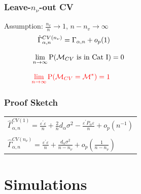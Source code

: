 \documentclass[20pt,mathserif]{beamer}
\begin{document}
\begin{frame}
\frametitle{Leave-$n_\nu$-out CV}
Assumption: $\frac{n_v}{n}\to 1$, $n-n_v\to \infty$
\begin{align*}
&\hspace{0.3cm}\hat{\Gamma}^{CV(n_\nu)}_{\alpha,n}=\Gamma_{\alpha,n}+o_p(1)&\hspace{5cm}&\\[8pt]
&\lim_{n\rightarrow\infty}\mathrm{P}(\mathcal{M}_{CV} \text{ is in Cat I})=0&&\\[8pt]
&{\color{red}\lim_{n\rightarrow\infty}\mathrm{P}(\mathcal{M}_{CV}=\mathcal{M}^\ast )=1}&&
\end{align*}
\end{frame}

\begin{frame}
\frametitle{Proof Sketch}
\setlength{\tabcolsep}{1pt}
\begin{tabular}{l}
$\hat{\Gamma}^{CV(1)}_{\alpha,n}=\frac{\varepsilon^\prime\varepsilon}{n}+\frac{2}{n}d_\alpha\sigma^2-\frac{\varepsilon^\prime P_\alpha\varepsilon}{n}+o_p(n^{-1})$\\\\
$\hat{\Gamma}^{CV(n_\nu)}_{\alpha,n}=\frac{\varepsilon^\prime\varepsilon}{n}+\frac{d_\alpha\sigma^2}{n-n_\nu}+o_p\left(\frac{1}{n-n_\nu}\right)$
\end{tabular}
\end{frame}

\thispagestyle{empty}
\section{Simulations}
\end{document}
